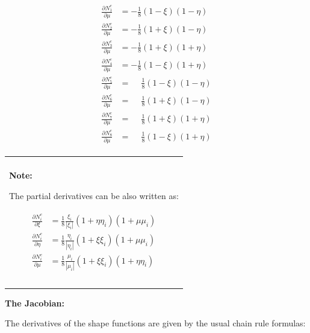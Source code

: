 \documentclass[10pt,b5paper,titlepage]{book}
\newenvironment{bbox}[1][0.96]
{
    \begin{center}
        \begin{tabular}{|p{#1\textwidth}|}
            \hline\\
}
{
            \\\\\hline
        \end{tabular}
    \end{center}
}
\newenvironment{eqarray}
{
    \begin{eqnarray}
        \begin{aligned}
}
{
        \end{aligned}
    \end{eqnarray}
}
\begin{document}
\begin{eqarray}
    \frac{\partial N_1^e}{\partial\mu} &= -\frac{1}{8} \left(1-\xi\right) \left(1-\eta\right)\\
    \frac{\partial N_2^e}{\partial\mu} &= -\frac{1}{8} \left(1+\xi\right) \left(1-\eta\right)\\
    \frac{\partial N_3^e}{\partial\mu} &= -\frac{1}{8} \left(1+\xi\right) \left(1+\eta\right)\\
    \frac{\partial N_4^e}{\partial\mu} &= -\frac{1}{8} \left(1-\xi\right) \left(1+\eta\right)\\
    \frac{\partial N_5^e}{\partial\mu} &= \phantom{-}\frac{1}{8} \left(1-\xi\right) \left(1-\eta\right)\\
    \frac{\partial N_6^e}{\partial\mu} &= \phantom{-}\frac{1}{8} \left(1+\xi\right) \left(1-\eta\right)\\
    \frac{\partial N_7^e}{\partial\mu} &= \phantom{-}\frac{1}{8} \left(1+\xi\right) \left(1+\eta\right)\\
    \frac{\partial N_8^e}{\partial\mu} &= \phantom{-}\frac{1}{8} \left(1-\xi\right) \left(1+\eta\right)
\end{eqarray}

\begin{bbox}
    \textbf{Note:}

    The partial derivatives can be also written as:

    \begin{eqarray}
        \frac{\partial N_i^e}{\partial \xi} &= \frac{1}{8} \frac{\xi_i}{|\xi_i|}
            \left(1+\eta\eta_i\right) \left(1+\mu\mu_i\right) \\
        \frac{\partial N_i^e}{\partial \eta} &= \frac{1}{8} \frac{\eta_i}{|\eta_i|}
            \left(1+\xi\xi_i\right) \left(1+\mu\mu_i\right) \\
        \frac{\partial N_i^e}{\partial \mu} &= \frac{1}{8} \frac{\mu_i}{|\mu_i|}
            \left(1+\xi\xi_i\right) \left(1+\eta\eta_i\right)
    \end{eqarray}
\end{bbox}



\textbf{The Jacobian:}

The derivatives of the shape functions are given by the usual chain rule formulas:
\end{document}
